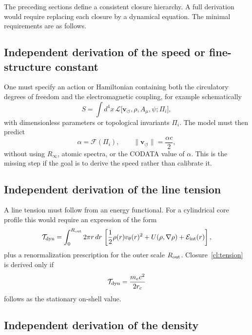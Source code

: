 \documentclass[aps,pra,preprint,longbibliography,nofootinbib]{revtex4-2}
\newcommand{\vnorm}{\lVert\mathbf{v}_{\!\boldsymbol{\circlearrowleft}}\rVert} %
\begin{document}
The preceding sections define a consistent closure hierarchy.  A full
derivation would require replacing each closure by a dynamical equation.
The minimal requirements are as follows.

\subsection{Independent derivation of the speed or fine-structure constant}

One must specify an action or Hamiltonian containing both the
circulatory degrees of freedom and the electromagnetic coupling, for
example schematically
\begin{equation}
  S = \int d^4x\,\mathcal{L}\bigl[\mathbf{v}_{\!\boldsymbol{\circlearrowleft}},
  \rho, A_\mu, \psi;\Pi_i\bigr],
  \label{eq:needed_action}
\end{equation}
with dimensionless parameters or topological invariants $\Pi_i$.  The
model must then predict
\begin{equation}
  \alpha = \mathcal{F}(\Pi_i),
  \qquad
  \vnorm = \frac{\alpha c}{2},
  \label{eq:needed_alpha}
\end{equation}
without using $R_\infty$, atomic spectra, or the CODATA value of
$\alpha$.  This is the missing step if the goal is to derive the speed
rather than calibrate it.

\subsection{Independent derivation of the line tension}

A line tension must follow from an energy functional.  For a cylindrical
core profile this would require an expression of the form
\begin{equation}
  \mathcal{T}_{\rm dyn}
  = \int_0^{R_{\rm out}}2\pi r\,dr\,
    \left[\frac{1}{2}\rho(r)v_\theta(r)^2
    +U(\rho,\nabla\rho)+\mathcal{E}_{\rm int}(r)\right],
  \label{eq:needed_tension}
\end{equation}
plus a renormalization prescription for the outer scale $R_{\rm out}$.
Closure~\ref{cl:tension} is derived only if
\begin{equation}
  \mathcal{T}_{\rm dyn}=\frac{m_ec^2}{2r_c}
  \label{eq:tension_target}
\end{equation}
follows as the stationary on-shell value.

\subsection{Independent derivation of the density}
\end{document}

